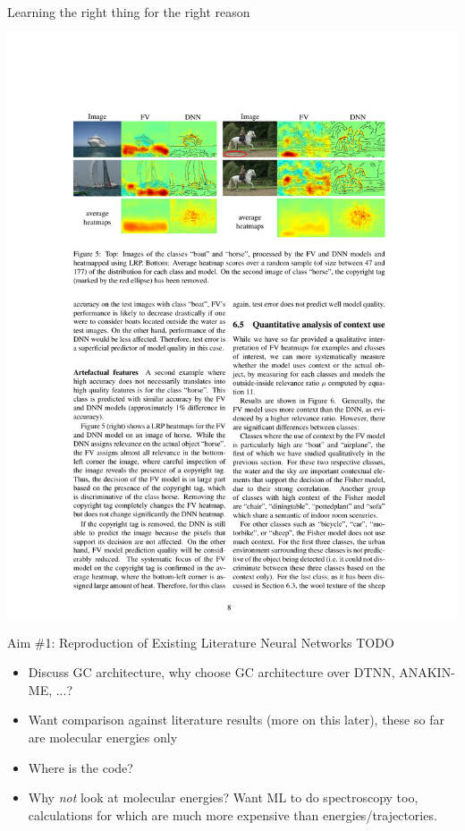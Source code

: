 \documentclass[xetex,compress]{beamer}
\begin{document}
\begin{frame}{Learning the right thing for the right reason}
  \begin{center}
    \includegraphics[width=1.00\textwidth]{./figures/fv_vs_dnn.pdf}
  \end{center}
\end{frame}

\begin{frame}{Aim \#1: Reproduction of Existing Literature Neural Networks}
  TODO
  \begin{itemize}
  \item Discuss GC architecture, why choose GC architecture over DTNN, ANAKIN-ME, ...?
  \item Want comparison against literature results (more on this later), these so far are molecular energies only
  \item Where is the code?
  \item Why \emph{not} look at molecular energies? Want ML to do spectroscopy too, calculations for which are much more expensive than energies/trajectories.
  \end{itemize}
\end{frame}
\end{document}
